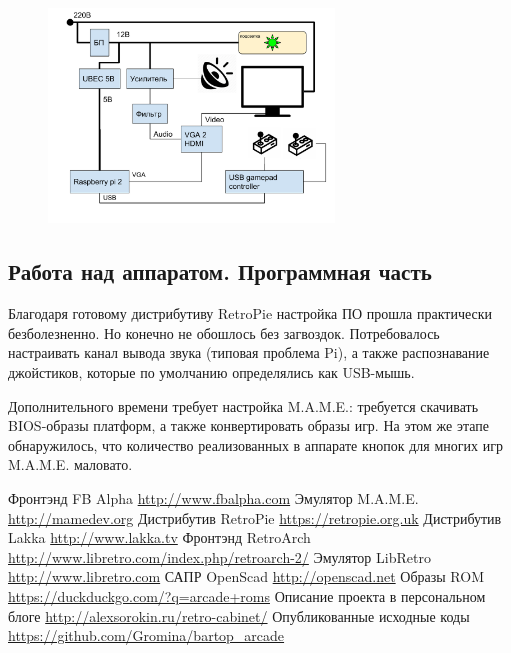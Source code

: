 \documentclass[10pt, a5paper]{article}
\begin{document}
\begin{figure}[h!]
  \centering
  \includegraphics[height=5.7cm]{27_2016_Sorokin1.pdf}
\end{figure}

\subsection*{Работа над аппаратом. Программная часть}

Благодаря готовому дистрибутиву RetroPie настройка ПО прошла практически безболезненно. Но конечно не обошлось без загвоздок.
Потребовалось настраивать канал вывода звука (типовая проблема Pi), а также распознавание джойстиков, которые по умолчанию определялись как USB-мышь.

Дополнительного времени требует настройка M.A.M.E.: требуется скачивать BIOS-образы платформ,  а также конвертировать образы игр.
На этом же этапе обнаружилось, что количество реализованных в аппарате кнопок для многих игр M.A.M.E. маловато.

\begin{thebibliography}{99}
Фронтэнд FB Alpha \url{http://www.fbalpha.com}
Эмулятор M.A.M.E. \url{http://mamedev.org}
Дистрибутив RetroPie \url{https://retropie.org.uk}
Дистрибутив Lakka \url{http://www.lakka.tv}
Фронтэнд RetroArch \url{http://www.libretro.com/index.php/retroarch-2/}
Эмулятор LibRetro \url{http://www.libretro.com}
САПР OpenScad \url{http://openscad.net}
Образы ROM \url{https://duckduckgo.com/?q=arcade+roms}
Описание проекта в персональном блоге  \url{http://alexsorokin.ru/retro-cabinet/}
Опубликованные исходные коды \url{https://github.com/Gromina/bartop\_arcade}
\end{thebibliography}
\end{document}
